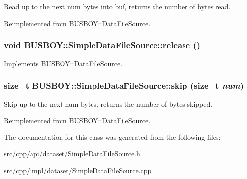 Read up to the next num bytes into buf, returns the number of bytes read. 

Reimplemented from \hyperlink{classBUSBOY_1_1DataFileSource_a7466bffda1100fb6f330382b4e491dd6}{BUSBOY::DataFileSource}.\hypertarget{classBUSBOY_1_1SimpleDataFileSource_a941e4ec1d63751ff8c5cb4b6b8c3b2cf}{
\subsubsection[{release}]{\setlength{\rightskip}{0pt plus 5cm}void BUSBOY::SimpleDataFileSource::release ()}}
\label{classBUSBOY_1_1SimpleDataFileSource_a941e4ec1d63751ff8c5cb4b6b8c3b2cf}


Implements \hyperlink{classBUSBOY_1_1DataFileSource_a9f78f31eddcf41fd393e99ee00278d09}{BUSBOY::DataFileSource}.\hypertarget{classBUSBOY_1_1SimpleDataFileSource_ad0cd565fa57bdac5f9d1c971590dbe2b}{
\subsubsection[{skip}]{\setlength{\rightskip}{0pt plus 5cm}size\_\-t BUSBOY::SimpleDataFileSource::skip (size\_\-t {\em num})}}
\label{classBUSBOY_1_1SimpleDataFileSource_ad0cd565fa57bdac5f9d1c971590dbe2b}


Skip up to the next num bytes, returns the number of bytes skipped. 

Reimplemented from \hyperlink{classBUSBOY_1_1DataFileSource_ab50fe5821ccaa51a26b65debe8fd1c84}{BUSBOY::DataFileSource}.

The documentation for this class was generated from the following files:\begin{DoxyCompactItemize}
\item 
src/cpp/api/dataset/\hyperlink{SimpleDataFileSource_8h}{SimpleDataFileSource.h}\item 
src/cpp/impl/dataset/\hyperlink{SimpleDataFileSource_8cpp}{SimpleDataFileSource.cpp}\end{DoxyCompactItemize}
